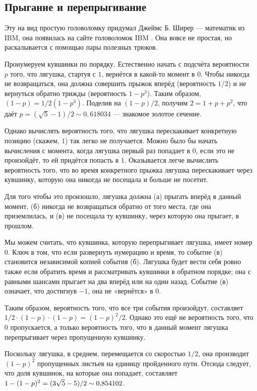 \subsection*{Прыгание и перепрыгивание}

Эту на вид простую головоломку придумал Джеймс Б. Ширер --- математик из IBM,
она появилась на сайте головоломок IBM \cite[апрель 2007]{ponder-this}.
Она вовсе не простая, но раскалывается с помощью пары полезных трюков.

Пронумеруем кувшинки по порядку.
Естественно начать с подсчёта вероятности $p$ того, что лягушка, стартуя с $1$, вернётся в какой-то момент в $0$.
Чтобы никогда не возвращаться, она должна совершить прыжок вперёд (вероятность $1/2$) и не вернуться обратно трижды (вероятность $1 - p^3$).
Таким образом, $(1 - p) = 1/2(1 - p^3)$.
Поделив на $(1 - p)/2$, получим $2 = 1 + p + p^2$, что даёт $p = (\sqrt5 - 1)/2 \sim 0{,}618034$ --- знакомое золотое сечение.

Однако вычислять вероятность того, что лягушка перескакивает конкретную позицию (скажем, $1$) так легко не получается.
Можно было бы начать вычисления с момента, когда лягушка первый раз попадает в $0$, если это не произойдёт, то ей придётся попасть в $1$.
Оказывается легче вычислить вероятность того, что во время конкретного прыжка лягушка перескакивает через кувшинку, которую она никогда не посещала и больше не посетит.

Для того чтобы это произошло, лягушка должна
(а) прыгать вперёд в данный момент,
(б) никогда не возвращаться обратно от того места, где она приземлилась,
и (в) не посещала ту кувшинку, через которую она прыгает, в прошлом.

Мы можем считать, что кувшинка, которую перепрыгивает лягушка, имеет номер 0.
Ключ в том, что если развернуть нумерацию и время, то событие (в) становится независимой копией события (б).
Лягушка будет вести себя ровно также если обратить время и рассматривать кувшинки в обратном порядке;
она с равными шансами прыгает на два вперёд или на один назад.
Событие (в) означает, что достигнув $-1$, она не «вернётся» в $0$.

Таким образом, вероятность того, что все три события произойдут, составляет $1/2 \cdot (1 - p) \cdot (1 - p) = (1 - p)^2 / 2$.
Однако это ещё не вероятность того, что $0$ пропускается, а только вероятность того, что в данный момент лягушка перепрыгивает через пропущенную кувшинку.

Поскольку лягушка, в среднем, перемещается со скоростью $1/2$, она производит $(1 - p)^2$ пропущенных листьев на единицу пройденного пути.
Отсюда следует, что доля кувшинок, на которые она попадает, составляет $1 - (1 - p)^2 \z= (3\sqrt5 - 5) / 2 \sim 0{,}854102$.

